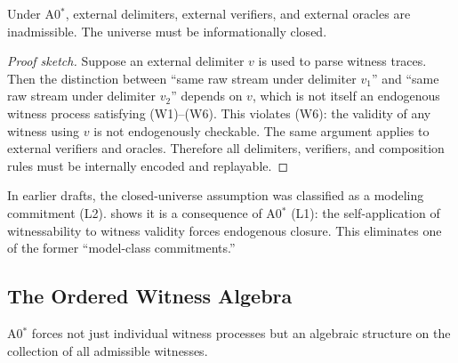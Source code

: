 \begin{theorem}
\label{thm:endogenous-boundary}
Under A0$^*$, external delimiters, external verifiers, and external oracles
are inadmissible.  The universe must be informationally closed.
\begin{proof}[Proof sketch]
Suppose an external delimiter $v$ is used to parse witness traces.  Then
the distinction between ``same raw stream under delimiter $v_1$'' and
``same raw stream under delimiter $v_2$'' depends on $v$, which is not
itself an endogenous witness process satisfying (W1)--(W6).  This violates
(W6): the validity of any witness using $v$ is not endogenously
checkable.  The same argument applies to external verifiers and oracles.
Therefore all delimiters, verifiers, and composition rules must be
internally encoded and replayable.
\end{proof}
\end{theorem}

\begin{remark}
\label{rem:closed-universe-l1}
In earlier drafts, the closed-universe assumption was classified as a
modeling commitment (L2).   shows it is a
consequence of A0$^*$ (L1): the self-application of witnessability to
witness validity forces endogenous closure.  This eliminates one of the
former ``model-class commitments.''
\end{remark}

\subsection{The Ordered Witness Algebra}
\label{sec:axioms:witness-algebra}

A0$^*$ forces not just individual witness processes but an algebraic
structure on the collection of all admissible witnesses.

